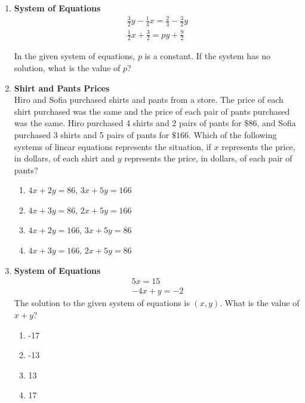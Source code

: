 \begin{enumerate}
\newpage

\item \textbf{System of Equations}\\
$$
\begin{gathered}
\frac{3}{2}y - \frac{1}{4}x = \frac{2}{3} - \frac{3}{2}y \\
\frac{1}{2}x + \frac{3}{2} = py + \frac{9}{2}
\end{gathered}
$$

In the given system of equations, $p$ is a constant. If the system has no solution, what is the value of $p$?
\begin{subanswer}
\end{subanswer}

\item \textbf{Shirt and Pants Prices}\\
Hiro and Sofia purchased shirts and pants from a store. The price of each shirt purchased was the same and the price of each pair of pants purchased was the same. Hiro purchased 4 shirts and 2 pairs of pants for $\$ 86$, and Sofia purchased 3 shirts and 5 pairs of pants for $\$ 166$. Which of the following systems of linear equations represents the situation, if $x$ represents the price, in dollars, of each shirt and $y$ represents the price, in dollars, of each pair of pants?
\begin{enumerate}[label=(\Alph*)]
  \item
  $4x + 2y = 86$, $3x + 5y = 166$
  \item
  $4x + 3y = 86$, $2x + 5y = 166$
  \item
  $4x + 2y = 166$, $3x + 5y = 86$
  \item
  $4x + 3y = 166$, $2x + 5y = 86$
\end{enumerate}
\begin{subanswer}
\end{subanswer}

\item \textbf{System of Equations}\\
$$
\begin{gathered}
5x = 15 \\
-4x + y = -2
\end{gathered}
$$
The solution to the given system of equations is $(x, y)$. What is the value of $x + y$?
\begin{enumerate}[label=(\Alph*)]
  \item -17
  \item -13
  \item 13
  \item 17
\end{enumerate}
\begin{subanswer}
\end{subanswer}


\end{enumerate}
